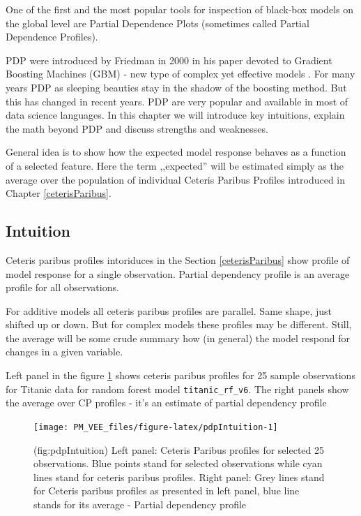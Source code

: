 \documentclass[12pt,]{krantz}
\begin{document}
One of the first and the most popular tools for inspection of black-box models on the global level are Partial Dependence Plots (sometimes called Partial Dependence Profiles).

PDP were introduced by Friedman in 2000 in his paper devoted to Gradient Boosting Machines (GBM) - new type of complex yet effective models \citep{Friedman00greedyfunction}. For many years PDP as sleeping beauties stay in the shadow of the boosting method. But this has changed in recent years. PDP are very popular and available in most of data science languages. In this chapter we will introduce key intuitions, explain the math beyond PDP and discuss strengths and weaknesses.

General idea is to show how the expected model response behaves as a function of a selected feature. Here the term ,,expected'' will be estimated simply as the average over the population of individual Ceteris Paribus Profiles introduced in Chapter \ref{ceterisParibus}.

\hypertarget{PDPIntuition}{%
\subsection{Intuition}\label{PDPIntuition}}

Ceteris paribus profiles intoriduces in the Section \ref{ceterisParibus} show profile of model response for a single observation.
Partial dependency profile is an average profile for all observations.

For additive models all ceteris paribus profiles are parallel. Same shape, just shifted up or down. But for complex models these profiles may be different.
Still, the average will be some crude summary how (in general) the model respond for changes in a given variable.

Left panel in the figure \ref{fig:pdpIntuition} shows ceteris paribus profiles for 25 sample observations for Titanic data for random forest model \texttt{titanic\_rf\_v6}. The right panels show the average over CP profiles - it's an estimate of partial dependency profile

\begin{figure}

{\centering \texttt{[image: PM\_VEE\_files/figure-latex/pdpIntuition-1]} 

}

\caption{(fig:pdpIntuition) Left panel: Ceteris Paribus profiles for selected 25 observations. Blue points stand for selected observations while cyan lines stand for ceteris paribus profiles. Right panel: Grey lines stand for Ceteris paribus profiles  as presented in left panel, blue line stands for its average - Partial dependency profile}\label{fig:pdpIntuition}
\end{figure}
\end{document}
